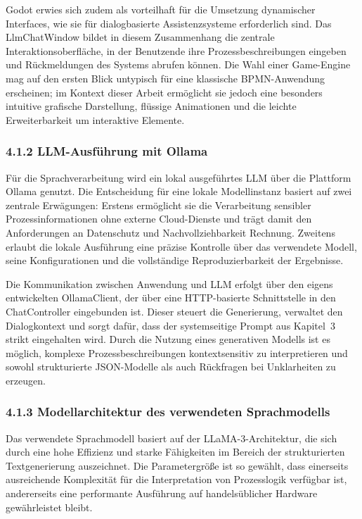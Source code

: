 \documentclass[a4paper,12pt]{scrreprt}
\begin{document}
Godot erwies sich zudem als vorteilhaft für die Umsetzung dynamischer Interfaces, wie sie für dialogbasierte Assistenzsysteme erforderlich sind. Das LlmChatWindow bildet in diesem Zusammenhang die zentrale Interaktionsoberfläche, 
in der Benutzende ihre Prozessbeschreibungen eingeben und Rückmeldungen des Systems abrufen können. Die Wahl einer Game-Engine mag auf den ersten Blick untypisch für eine klassische BPMN-Anwendung erscheinen; im Kontext dieser Arbeit ermöglicht sie jedoch eine besonders intuitive grafische Darstellung, flüssige Animationen und die leichte Erweiterbarkeit um interaktive Elemente.

\subsubsection*{4.1.2 LLM-Ausführung mit Ollama}

Für die Sprachverarbeitung wird ein lokal ausgeführtes LLM über die Plattform Ollama genutzt. Die Entscheidung für eine lokale Modellinstanz basiert auf zwei zentrale Erwägungen: Erstens ermöglicht sie die Verarbeitung sensibler Prozessinformationen ohne externe Cloud-Dienste und trägt damit den Anforderungen an Datenschutz und Nachvollziehbarkeit Rechnung. Zweitens erlaubt die lokale Ausführung eine präzise Kontrolle über das verwendete Modell, seine Konfigurationen und die vollständige Reproduzierbarkeit der Ergebnisse.

Die Kommunikation zwischen Anwendung und LLM erfolgt über den eigens entwickelten OllamaClient, der über eine HTTP-basierte Schnittstelle in den ChatController eingebunden ist. Dieser steuert die Generierung, verwaltet den Dialogkontext und sorgt dafür, dass der systemseitige Prompt aus Kapitel~3 strikt eingehalten wird. Durch die Nutzung eines generativen Modells ist es möglich, komplexe Prozessbeschreibungen kontextsensitiv zu interpretieren und sowohl strukturierte JSON-Modelle als auch Rückfragen bei Unklarheiten zu erzeugen.

\subsubsection*{4.1.3 Modellarchitektur des verwendeten Sprachmodells}

Das verwendete Sprachmodell basiert auf der LLaMA-3-Architektur, die sich durch eine hohe Effizienz und starke Fähigkeiten im Bereich der strukturierten Textgenerierung auszeichnet. Die Parametergröße ist so gewählt, dass einerseits ausreichende Komplexität für die Interpretation von Prozesslogik verfügbar ist, andererseits eine performante Ausführung auf handelsüblicher Hardware gewährleistet bleibt. 
\end{document}

